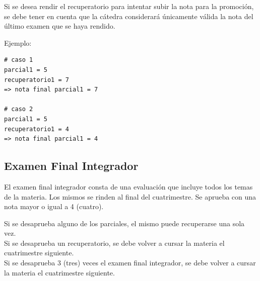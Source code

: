 \documentclass[
  letterpaper,
  DIV=11,
  numbers=noendperiod]{scrreprt}
\begin{document}
\begin{tcolorbox}[enhanced jigsaw, opacitybacktitle=0.6, toptitle=1mm, toprule=.15mm, arc=.35mm, breakable, bottomrule=.15mm, opacityback=0, leftrule=.75mm, rightrule=.15mm, title=\textcolor{quarto-callout-tip-color}{\faLightbulb}\hspace{0.5em}{Rendir Recuperatorios para Promoción}, left=2mm, bottomtitle=1mm, colframe=quarto-callout-tip-color-frame, colback=white, titlerule=0mm, coltitle=black, colbacktitle=quarto-callout-tip-color!10!white]

Si se desea rendir el recuperatorio para intentar subir la nota para la
promoción, se debe tener en cuenta que la cátedra considerará únicamente
válida la nota del último examen que se haya rendido.

Ejemplo:

\begin{verbatim}
# caso 1
parcial1 = 5
recuperatorio1 = 7
=> nota final parcial1 = 7

# caso 2
parcial1 = 5
recuperatorio1 = 4
=> nota final parcial1 = 4
\end{verbatim}

\end{tcolorbox}

\subsection*{Examen Final Integrador}\label{examen-final-integrador}

El examen final integrador consta de una evaluación que incluye todos
los temas de la materia. Los mismos se rinden al final del cuatrimestre.
Se aprueba con una nota mayor o igual a 4 (cuatro).

\begin{tcolorbox}[enhanced jigsaw, opacitybacktitle=0.6, toptitle=1mm, toprule=.15mm, arc=.35mm, breakable, bottomrule=.15mm, opacityback=0, leftrule=.75mm, rightrule=.15mm, title=\textcolor{quarto-callout-warning-color}{\faExclamationTriangle}\hspace{0.5em}{Desaprobación de la Materia}, left=2mm, bottomtitle=1mm, colframe=quarto-callout-warning-color-frame, colback=white, titlerule=0mm, coltitle=black, colbacktitle=quarto-callout-warning-color!10!white]

Si se desaprueba alguno de los parciales, el mismo puede recuperarse una
sola vez.\\
Si se desaprueba un recuperatorio, se debe volver a cursar la materia el
cuatrimestre siguiente.\\
Si se desaprueba 3 (tres) veces el examen final integrador, se debe
volver a cursar la materia el cuatrimestre siguiente.

\end{tcolorbox}
\end{document}
